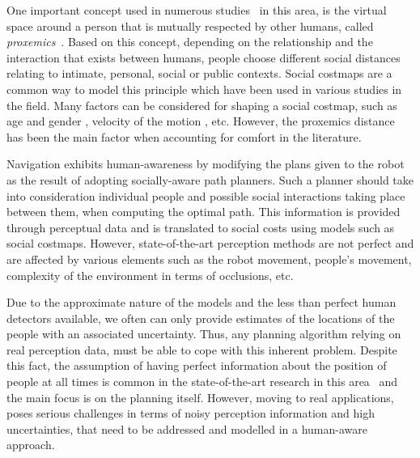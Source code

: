 
One important concept used in numerous studies~\cite{Mumm2011,Takayama2009,Walters2011,ferrer2013robot} in this area, is the virtual space around a person that is mutually respected by other humans, called \textit{proxemics}~\cite{Hall1969}.
Based on this concept, depending on the relationship and the interaction that exists between humans, people choose different social distances relating to intimate, personal, social or public contexts.
Social costmaps are a common way to model this principle which have been used in various studies in the field. %
Many factors can be considered for shaping a social costmap, such as age and gender \cite{dautenhahn2006may}, velocity of the motion \cite{kirby2009companion}, etc. However, the proxemics distance has been the main factor when accounting for comfort in the literature.%

Navigation exhibits human-awareness by modifying the plans given to the robot as the result of adopting socially-aware path planners.
Such a planner should take into consideration individual people and possible social interactions taking place between them, when computing the optimal path. This information is provided through perceptual data and is translated to social costs using models such as social costmaps. However, state-of-the-art perception methods are not perfect and are affected by various elements such as the robot movement, people's movement, complexity of the environment in terms of occlusions, etc. 


Due to the approximate nature of the models and the less than perfect human detectors available, we often can only provide estimates of the locations of the people with an associated uncertainty. Thus, any planning algorithm relying on real perception data, must be able to cope with this inherent problem. Despite this fact, the assumption of having perfect information about the position of people at all times is common in the state-of-the-art research in this area%
~and the main focus is on the planning itself. However, moving to real applications, poses serious challenges in terms of noisy perception information and high uncertainties, that need to be addressed and modelled in a human-aware approach.


